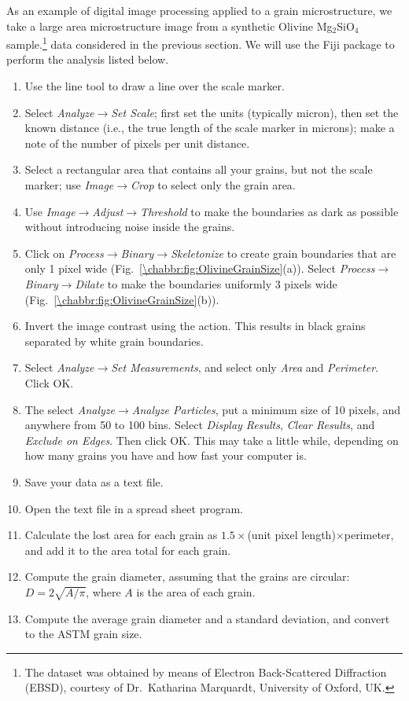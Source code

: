 As an example of digital image processing applied to a grain microstructure, we take a large area microstructure image from a synthetic Olivine Mg$_2$SiO$_4$ sample.\footnote{The dataset was obtained by means of Electron Back-Scattered Diffraction (EBSD), courtesy of Dr.\ Katharina Marquardt, University of Oxford, UK.} data considered in the previous section.  We will use the {\color{blue}Fiji}  package to perform the analysis listed below.

\begin{enumerate}
\item Use the line tool to draw a line over the scale marker.
\item Select \textit{Analyze$\rightarrow$Set Scale}; first set the units (typically micron), then set the known distance (i.e., the true length
of the scale marker in microns);  make a note of the number of pixels per unit distance.
\item Select a rectangular area that contains all your grains, but not the scale marker; use \textit{Image$\rightarrow$Crop} to select
only the grain area. 
\item Use \textit{Image$\rightarrow$Adjust$\rightarrow$Threshold} to make the boundaries as dark as possible without introducing
noise inside the grains.  
\item Click on \textit{Process$\rightarrow$Binary$\rightarrow$Skeletonize} to create grain boundaries that are only 1 pixel wide (Fig.~\ref{\chabbr:fig:OlivineGrainSize}(a)).  Select
\textit{Process$\rightarrow$Binary$\rightarrow$Dilate} to make the boundaries uniformly 3 pixels wide (Fig.~\ref{\chabbr:fig:OlivineGrainSize}(b)).
\item Invert the image contrast using the  action.  This results in black grains separated by white grain boundaries.
\item Select \textit{Analyze$\rightarrow$Set Measurements}, and select only \textit{Area} and \textit{Perimeter}.  Click OK.
\item The select \textit{Analyze$\rightarrow$Analyze Particles}, put a minimum size of 10 pixels, and anywhere from 50 to 100 bins.
Select \textit{Display Results}, \textit{Clear Results},  and \textit{Exclude on Edges}.  Then click OK.  This may take a little
while, depending on how many grains you have and how fast your computer is.
\item Save your data as a text file.
\item Open the text file in a spread sheet program.
\item Calculate the lost area for each grain as $1.5\times$(unit pixel length)$\times$perimeter, and add it to the area total for each grain.
\item Compute the grain diameter, assuming that the grains are circular:  $D=2\sqrt{A/\pi}$, where $A$ is the area of each grain.  
\item Compute the average grain diameter and a standard deviation, and convert to the ASTM grain size.
\end{enumerate}

